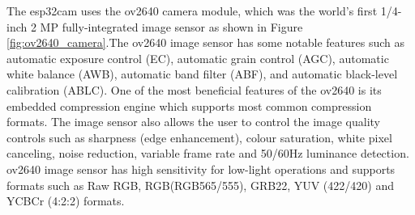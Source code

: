 The \ac{esp32cam} uses the \ac{ov2640} camera module, which was the world’s first 1/4-inch 2 MP fully-integrated image sensor as shown in Figure \ref{fig:ov2640_camera}.The \ac{ov2640} image sensor has some notable features such as automatic exposure control (EC), automatic grain control (AGC), automatic white balance (AWB), automatic band filter (ABF), and automatic black-level calibration (ABLC). One of the most beneficial features of the \ac{ov2640} is its embedded compression engine which supports most common compression formats. The image sensor also allows the user to control the image quality controls such as sharpness (edge enhancement), colour saturation, white pixel canceling, noise reduction, variable frame rate and 50/60Hz luminance detection. \ac{ov2640} image sensor has high sensitivity for low-light operations and supports formats such as Raw RGB, RGB(RGB565/555), GRB22, YUV (422/420) and YCBCr (4:2:2) formats. 


